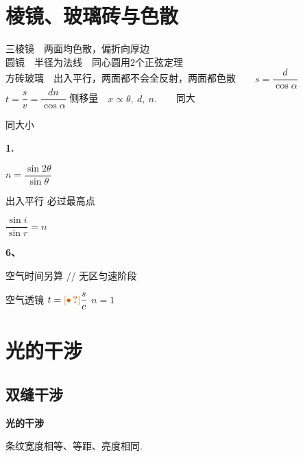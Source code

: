 \section{棱镜、玻璃砖与色散}
三棱镜　两面均色散，偏折向厚边\\
圆镜　半径为法线　同心圆用$2$个正弦定理\\
方砖玻璃　出入平行，两面都不会全反射，两面都色散　　$s=\dfrac{d}{\cos\alpha}$　　$t=\dfrac{s}{v}=\dfrac{dn}{\cos\alpha}$ %
侧移量　$x\propto\theta,\ d,\ n.$　　同大

\quad {} 同大小

\textbf{1.}

 $n=\dfrac{\sin 2\theta}{\sin\theta}$ %


出入平行 必过最高点

$\dfrac{\sin i}{\sin r}=n$

\textbf{6、}
\begin{keybox}
空气时间另算 // 无区匀速阶段
\end{keybox}
空气透镜 \quad $t=\text{\unclear{$\bullet$}}\dfrac{s}{c}$ \quad $n=1$ %


\section{光的干涉}
\subsection{双缝干涉}
\textbf{光的干涉}


条纹宽度相等、等距、亮度相同.

